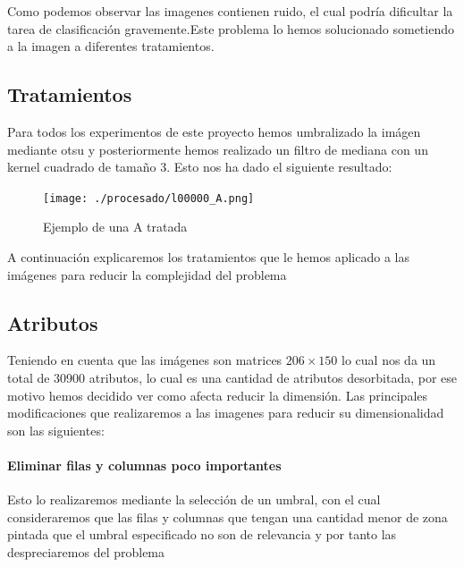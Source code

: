 \documentclass[8pt,a4paper]{article}
\begin{document}
Como podemos observar las imagenes contienen ruido, el cual podría dificultar la tarea de clasificación gravemente.Este problema lo hemos solucionado sometiendo a la imagen a diferentes tratamientos.

\subsection{Tratamientos}

Para todos los experimentos de este proyecto hemos umbralizado la imágen mediante otsu y posteriormente hemos realizado un filtro de mediana con un kernel cuadrado de tamaño 3.
Esto nos ha dado el siguiente resultado:
\begin{figure}[htbp]
	\centering
    \texttt{[image: ./procesado/l00000\_A.png]}
    \caption{Ejemplo de una A tratada}
\end{figure}

A continuación explicaremos los tratamientos que le hemos aplicado a las imágenes para reducir la complejidad del problema

\subsection{Atributos}
Teniendo en cuenta que las imágenes son matrices $206\times150$ lo cual nos da un total de 30900 atributos, lo cual es una cantidad de atributos desorbitada, por ese motivo hemos decidido ver como afecta reducir la dimensión.
Las principales modificaciones que realizaremos a las imagenes para reducir su dimensionalidad son las siguientes:

\paragraph{Eliminar filas y columnas poco importantes}


Esto lo realizaremos mediante la selección de un umbral, con el cual consideraremos que las filas y columnas que tengan una cantidad menor de zona pintada que el umbral especificado no son de relevancia y por tanto las despreciaremos del problema
\end{document}
